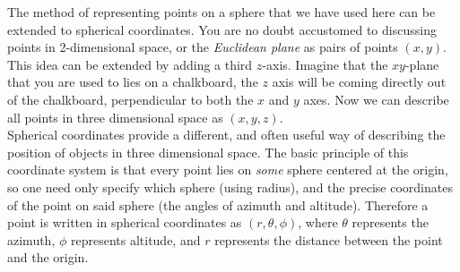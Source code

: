 The method of representing points on a sphere that we have used here can be extended to spherical coordinates. You are no doubt accustomed to discussing points in 2-dimensional space, or the \emph{Euclidean plane} as pairs of points $(x,y)$. This idea can be extended by adding a third $z$-axis. Imagine that the $xy$-plane that you are used to lies on a chalkboard, the $z$ axis will be coming directly out of the chalkboard, perpendicular to both the $x$ and $y$ axes. Now we can describe all points in three dimensional space as $(x,y,z)$. \\

Spherical coordinates provide a different, and often useful way of describing the position of objects in three dimensional space. The basic principle of this coordinate system is that every point lies on \emph{some} sphere centered at the origin, so one need only specify which sphere (using radius), and the precise coordinates of the point on said sphere (the angles of azimuth and altitude). Therefore a point is written in spherical coordinates as $(r,\theta,\phi)$, where $\theta$ represents the azimuth, $\phi$ represents altitude, and $r$ represents the distance between the point and the origin. \\

 \vspace{0.2cm}

